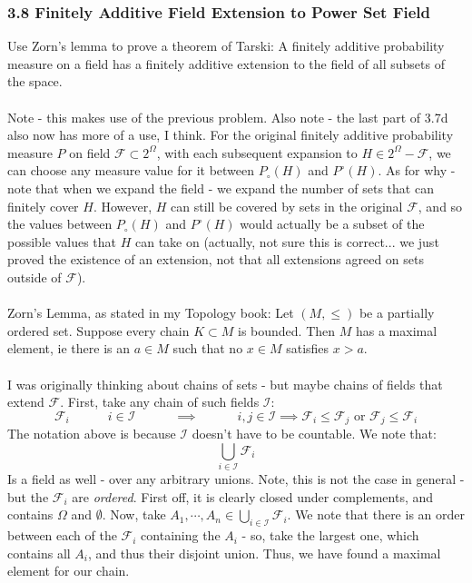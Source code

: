 \documentclass[12pt,a4paper]{article}
\newcommand{\1}[1]{\mathbbm{1}\left\{ #1 \right\}}
\newcommand{\ical}{\mathcal{I}}
\newcommand{\fcal}{\mathcal{F}}
\begin{document}
\begin{enumerate}
\end{enumerate}

\subsubsection{3.8 Finitely Additive Field Extension to Power Set Field} Use Zorn's lemma to prove a theorem of Tarski: A finitely additive probability measure on a field has a finitely additive extension to the field of all subsets of the space.
\\\\
Note - this makes use of the previous problem. Also note - the last part of 3.7d also now has more of a use, I think. For the original finitely additive probability measure $P$ on field $\fcal \subset 2^{\Omega}$, with each subsequent expansion to $H \in 2^{\Omega} - \fcal$, we can choose any measure value for it between $P_\circ(H)$ and $P^\circ(H)$. As for why - note that when we expand the field - we expand the number of sets that can finitely cover $H$. However, $H$ can still be covered by sets in the original $\fcal$, and so the values between $P_\circ(H)$ and $P^\circ(H)$ would actually be a subset of the possible values that $H$ can take on (actually, not sure this is correct... we just proved the existence of an extension, not that all extensions agreed on sets outside of $\fcal$).
\\\\
Zorn's Lemma, as stated in my Topology book: Let $(M, \leq)$ be a partially ordered set. Suppose every chain $K \subset M$ is bounded. Then $M$ has a maximal element, ie there is an $a \in M$ such that no $x \in M$ satisfies $x > a$.
\\\\
I was originally thinking about chains of sets - but maybe chains of fields that extend $\fcal$. First, take any chain of such fields $\ical$:
$$
	\fcal_i \quad\quad\quad i \in \ical \quad\quad\quad
	\implies
	\quad\quad\quad
	i,j \in \ical \implies \fcal_i \leq \fcal_j \text{ or } \fcal_j \leq \fcal_i
$$
The notation above is because $\ical$ doesn't have to be countable. We note that:
$$
	\bigcup_{i \in \ical} \fcal_i
$$
Is a field as well - over any arbitrary unions. Note, this is not the case in general - but the $\fcal_i$ are \textit{ordered}. First off, it is clearly closed under complements, and contains $\Omega$ and $\emptyset$. Now, take $A_1, \cdots, A_n \in \bigcup_{i \in \ical} \fcal_i$. We note that there is an order between each of the $\fcal_i$ containing the $A_i$ - so, take the largest one, which contains all $A_i$, and thus their disjoint union. Thus, we have found a maximal element for our chain.
\end{document}
